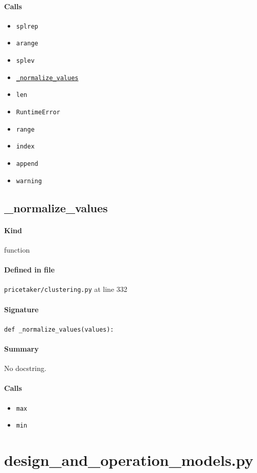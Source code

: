 \documentclass[11pt]{report}
\begin{document}
\paragraph{Calls}
\begin{itemize}[leftmargin=*]
  \item \texttt{splrep}
  \item \texttt{arange}
  \item \texttt{splev}
  \item \hyperref[def:pricetaker-clustering.py:_normalize_values:L332]{\texttt{\_normalize\_values}}
  \item \texttt{len}
  \item \texttt{RuntimeError}
  \item \texttt{range}
  \item \texttt{index}
  \item \texttt{append}
  \item \texttt{warning}
\end{itemize}
\subsection{\_normalize\_values}
\label{def:pricetaker-clustering.py:_normalize_values:L332}
\paragraph{Kind} function
\paragraph{Defined in file} \texttt{pricetaker/clustering.py} at line 332
\paragraph{Signature} \texttt{def \_normalize\_values(values):}
\paragraph{Summary} No docstring.
\paragraph{Calls}
\begin{itemize}[leftmargin=*]
  \item \texttt{max}
  \item \texttt{min}
\end{itemize}

\section{design\_and\_operation\_models.py}
\label{file:pricetaker-design_and_operation_models.py}
\end{document}
